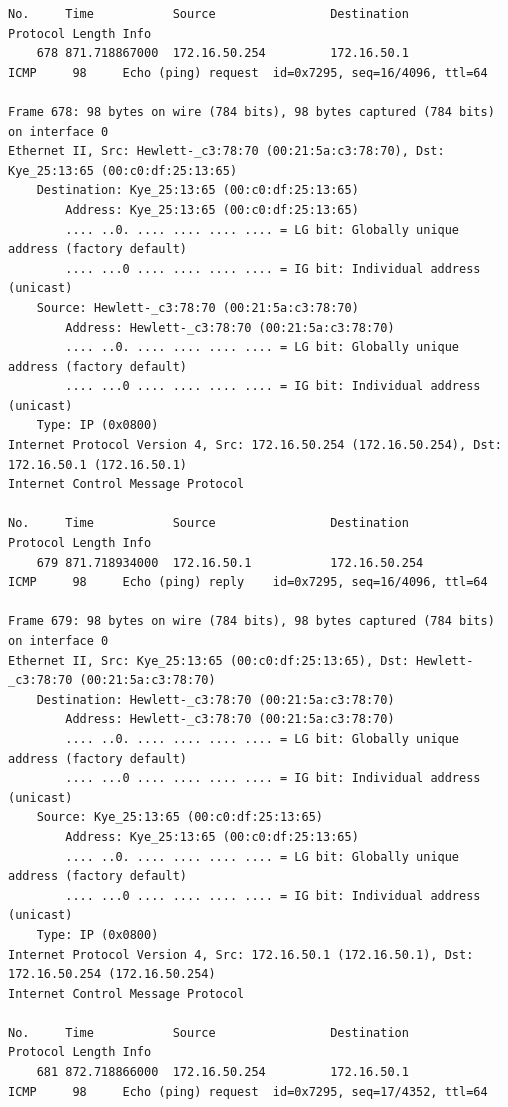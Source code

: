 \documentclass[a4paper,11pt]{article}
\begin{document}
\begin{lstlisting}
No.     Time           Source                Destination           Protocol Length Info
    678 871.718867000  172.16.50.254         172.16.50.1           ICMP     98     Echo (ping) request  id=0x7295, seq=16/4096, ttl=64

Frame 678: 98 bytes on wire (784 bits), 98 bytes captured (784 bits) on interface 0
Ethernet II, Src: Hewlett-_c3:78:70 (00:21:5a:c3:78:70), Dst: Kye_25:13:65 (00:c0:df:25:13:65)
    Destination: Kye_25:13:65 (00:c0:df:25:13:65)
        Address: Kye_25:13:65 (00:c0:df:25:13:65)
        .... ..0. .... .... .... .... = LG bit: Globally unique address (factory default)
        .... ...0 .... .... .... .... = IG bit: Individual address (unicast)
    Source: Hewlett-_c3:78:70 (00:21:5a:c3:78:70)
        Address: Hewlett-_c3:78:70 (00:21:5a:c3:78:70)
        .... ..0. .... .... .... .... = LG bit: Globally unique address (factory default)
        .... ...0 .... .... .... .... = IG bit: Individual address (unicast)
    Type: IP (0x0800)
Internet Protocol Version 4, Src: 172.16.50.254 (172.16.50.254), Dst: 172.16.50.1 (172.16.50.1)
Internet Control Message Protocol

No.     Time           Source                Destination           Protocol Length Info
    679 871.718934000  172.16.50.1           172.16.50.254         ICMP     98     Echo (ping) reply    id=0x7295, seq=16/4096, ttl=64

Frame 679: 98 bytes on wire (784 bits), 98 bytes captured (784 bits) on interface 0
Ethernet II, Src: Kye_25:13:65 (00:c0:df:25:13:65), Dst: Hewlett-_c3:78:70 (00:21:5a:c3:78:70)
    Destination: Hewlett-_c3:78:70 (00:21:5a:c3:78:70)
        Address: Hewlett-_c3:78:70 (00:21:5a:c3:78:70)
        .... ..0. .... .... .... .... = LG bit: Globally unique address (factory default)
        .... ...0 .... .... .... .... = IG bit: Individual address (unicast)
    Source: Kye_25:13:65 (00:c0:df:25:13:65)
        Address: Kye_25:13:65 (00:c0:df:25:13:65)
        .... ..0. .... .... .... .... = LG bit: Globally unique address (factory default)
        .... ...0 .... .... .... .... = IG bit: Individual address (unicast)
    Type: IP (0x0800)
Internet Protocol Version 4, Src: 172.16.50.1 (172.16.50.1), Dst: 172.16.50.254 (172.16.50.254)
Internet Control Message Protocol

No.     Time           Source                Destination           Protocol Length Info
    681 872.718866000  172.16.50.254         172.16.50.1           ICMP     98     Echo (ping) request  id=0x7295, seq=17/4352, ttl=64


\end{lstlisting}
\end{document}
